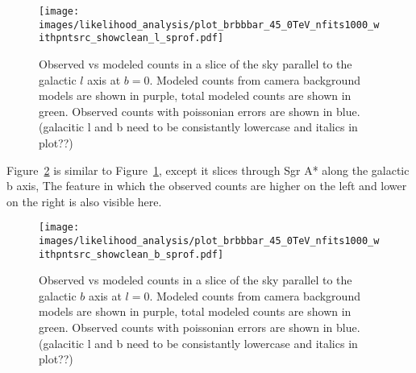   \begin{figure}[h]
    \centering
    \texttt{[image: images/likelihood\_analysis/plot\_brbbbar\_45\_0TeV\_nfits1000\_withpntsrc\_showclean\_l\_sprof.pdf]}
    \caption[Galactic Center Profile vs Galactic $l$]{
      Observed vs modeled counts in a slice of the sky parallel to the galactic $l$ axis at $b=0$.
      Modeled counts from camera background models are shown in purple, total modeled counts are shown in green.
      Observed counts with poissonian errors are shown in blue.
      {\color{red}(galacitic l and b need to be consistantly lowercase and italics in plot??)}
    }
    \label{fig:gc_profile_gal_l}
  \end{figure}

  Figure~\ref{fig:gc_profile_gal_b} is similar to Figure~\ref{fig:gc_profile_gal_l}, except it slices through Sgr A* along the galactic b axis,
  The feature in which the observed counts are higher on the left and lower on the right is also visible here.

  \begin{figure}[h]
    \centering
    \texttt{[image: images/likelihood\_analysis/plot\_brbbbar\_45\_0TeV\_nfits1000\_withpntsrc\_showclean\_b\_sprof.pdf]}
    \caption[Galactic Center Profile vs Galactic $b$]{
      Observed vs modeled counts in a slice of the sky parallel to the galactic $b$ axis at $l=0$.
      Modeled counts from camera background models are shown in purple, total modeled counts are shown in green.
      Observed counts with poissonian errors are shown in blue.
      {\color{red}(galacitic l and b need to be consistantly lowercase and italics in plot??)}
    }
    \label{fig:gc_profile_gal_b}
  \end{figure}

